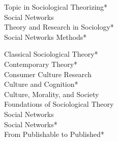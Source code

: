 \begin{multicols}{2}
[]
\noindent
Topic in Sociological Theorizing\textcolor{uclablue}{*}  \\
Social Networks \\
Theory and Research in Sociology\textcolor{uclablue}{*} \\
Social Networks Methods\textcolor{uclablue}{*}
\end{multicols}  
\medskip
\begin{multicols}{2}
[]
\noindent
Classical Sociological Theory\textcolor{uclablue}{*}   \\
Contemporary Theory\textcolor{uclablue}{*}  \\
Consumer Culture Research  \\
Culture and Cognition\textcolor{uclablue}{*}  \\
Culture, Morality, and Society  \\
Foundations of Sociological Theory  \\
Social Networks  \\
Social Networks\textcolor{uclablue}{*}   \\
From Publishable to Published\textcolor{uclablue}{*}   \\
\end{multicols} 